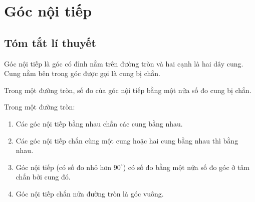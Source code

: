 \section{Góc nội tiếp}
\subsection{Tóm tắt lí thuyết}
\begin{dn}
Góc nội tiếp là góc có đỉnh nằm trên đường tròn và hai cạnh là hai dây cung. Cung nằm bên trong góc được gọi là cung bị chắn.
\end{dn}
\begin{dl}
Trong một đường tròn, số đo của góc nội tiếp bằng một nửa số đo cung bị chắn.
	
\end{dl}
\begin{dl}
	Trong một đường tròn:
		\begin{enumerate}
			\item Các góc nội tiếp bằng nhau chắn các cung bằng nhau.
			\item Các góc nội tiếp chắn cùng một cung hoặc hai cung bằng nhau thì bằng nhau.
			\item  Góc nội tiếp (có số đo nhỏ hơn $90^\circ$) có số đo bằng một nửa số đo góc ở tâm chắn bởi cung đó.
			\item Góc nội tiếp chắn nửa đường tròn là góc vuông.
		\end{enumerate}
\end{dl}

